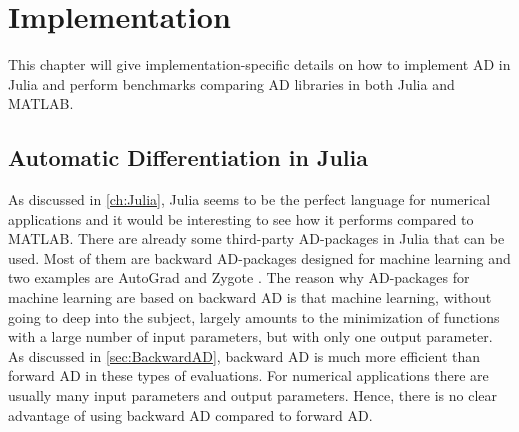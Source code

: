 \chapter{Implementation}
\label{ch:Implementation}
This chapter will give implementation-specific details on how to implement AD in Julia and perform benchmarks comparing AD libraries in both Julia and MATLAB.

\section{Automatic Differentiation in Julia}
\label{sec:ADInJulia}
As discussed in \autoref{ch:Julia}, Julia seems to be the perfect language for numerical applications and it would be interesting to see how it performs compared to MATLAB. There are already some third-party AD-packages in Julia that can be used. Most of them are backward AD-packages designed for machine learning and two examples are AutoGrad \citep{knet2016mlsys} and Zygote \citep{innes2018don}. The reason why AD-packages for machine learning are based on backward AD is that machine learning, without going to deep into the subject, largely amounts to the minimization of functions with a large number of input parameters, but with only one output parameter. As discussed in \autoref{sec:BackwardAD}, backward AD is much more efficient than forward AD in these types of evaluations. For numerical applications there are usually many input parameters and output parameters. Hence, there is no clear advantage of using backward AD compared to forward AD. 

